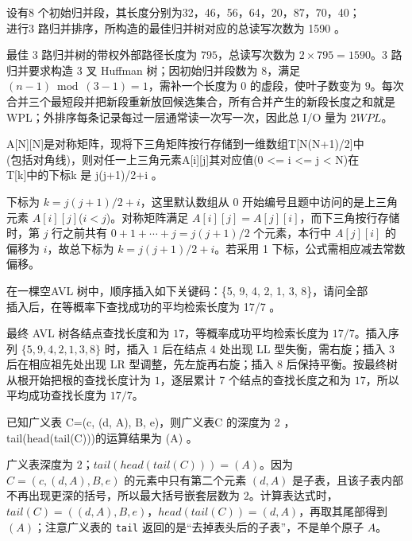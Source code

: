 \begin{question}
设有8 个初始归并段，其长度分别为32，46，56，64，20，87，70，40；\\
进行3 路归并排序，所构造的最佳归并树对应的总读写次数为 1590   。\\
\begin{solution}
最佳 3 路归并树的带权外部路径长度为 $795$，总读写次数为 $2\times795=1590$。3 路归并要求构造 3 叉 Huffman 树；因初始归并段数为 $8$，满足 $(n-1)\bmod(3-1)=1$，需补一个长度为 $0$ 的虚段，使叶子数变为 $9$。每次合并三个最短段并把新段重新放回候选集合，所有合并产生的新段长度之和就是 WPL；外排序每条记录每过一层通常读一次写一次，因此总 I/O 量为 $2WPL$。
\end{solution}
\end{question}

\begin{question}
A[N][N]是对称矩阵，现将下三角矩阵按行存储到一维数组T[N(N+1)/2]中\\
(包括对角线)，则对任一上三角元素A[i][j]其对应值(0 <= i <= j < N)在\\
T[k]中的下标k 是     j(j+1)/2+i       。\\
\begin{solution}
下标为 $k=j(j+1)/2+i$，这里默认数组从 $0$ 开始编号且题中访问的是上三角元素 $A[i][j]$($i<j$)。对称矩阵满足 $A[i][j]=A[j][i]$，而下三角按行存储时，第 $j$ 行之前共有 $0+1+\cdots+j=j(j+1)/2$ 个元素，本行中 $A[j][i]$ 的偏移为 $i$，故总下标为 $k=j(j+1)/2+i$。若采用 1 下标，公式需相应减去常数偏移。
\end{solution}
\end{question}

\begin{question}
在一棵空AVL 树中，顺序插入如下关键码：\{5, 9, 4, 2, 1, 3, 8\}，请问全部\\
插入后，在等概率下查找成功的平均检索长度为  17/7     。\\
\begin{solution}
最终 AVL 树各结点查找长度和为 $17$，等概率成功平均检索长度为 $17/7$。插入序列 $\{5,9,4,2,1,3,8\}$ 时，插入 $1$ 后在结点 $4$ 处出现 LL 型失衡，需右旋；插入 $3$ 后在相应祖先处出现 LR 型调整，先左旋再右旋；插入 $8$ 后保持平衡。按最终树从根开始把根的查找长度计为 $1$，逐层累计 7 个结点的查找长度之和为 $17$，所以平均成功查找长度为 $17/7$。
\end{solution}
\end{question}

\begin{question}
已知广义表 C=(c, (d, A), B, e)，则广义表C 的深度为   2     ，\\
tail(head(tail(C)))的运算结果为  (A)     。\\
\begin{solution}
广义表深度为 $2$；$tail(head(tail(C)))=(A)$。因为 $C=(c,(d,A),B,e)$ 的元素中只有第二个元素 $(d,A)$ 是子表，且该子表内部不再出现更深的括号，所以最大括号嵌套层数为 $2$。计算表达式时，$tail(C)=((d,A),B,e)$，$head(tail(C))=(d,A)$，再取其尾部得到 $(A)$；注意广义表的 \texttt{tail} 返回的是“去掉表头后的子表”，不是单个原子 $A$。
\end{solution}
\end{question}

